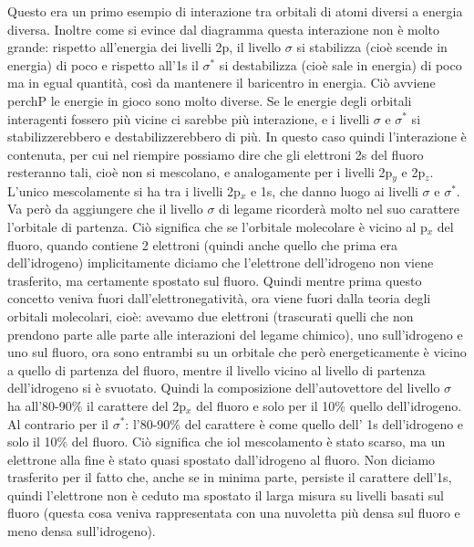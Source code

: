 Questo era un primo esempio di interazione tra orbitali di atomi diversi a energia diversa. Inoltre come si evince dal diagramma questa interazione non è molto grande: rispetto all'energia dei livelli 2p, il livello $\sigma$ si stabilizza (cioè scende in energia) di poco e rispetto all'1s il $\sigma^*$ si destabilizza (cioè sale in energia) di poco ma in egual quantità, così da mantenere il baricentro in energia. Ciò avviene perchP le energie in gioco sono molto diverse. Se le energie degli orbitali interagenti fossero più vicine ci sarebbe più interazione, e i livelli $\sigma$ e $\sigma^*$ si stabilizzerebbero e destabilizzerebbero di più. In questo caso quindi l'interazione è contenuta, per cui nel riempire possiamo dire che gli elettroni 2s del fluoro resteranno tali, cioè non si mescolano, e analogamente per i livelli 2p$_y$ e 2p$_z$. L'unico mescolamente si ha tra i livelli 2p$_x$ e 1s, che danno luogo ai livelli $\sigma$ e $\sigma^*$. Va però da aggiungere che il livello $\sigma$ di legame ricorderà molto nel suo carattere l'orbitale di partenza. Ciò significa che se l'orbitale molecolare è vicino al p$_x$ del fluoro, quando contiene 2 elettroni (quindi anche quello che prima era dell'idrogeno) implicitamente diciamo che l'elettrone dell'idrogeno non viene trasferito, ma certamente spostato sul fluoro. Quindi mentre prima questo concetto veniva fuori dall'elettronegatività, ora viene fuori dalla teoria degli orbitali molecolari, cioè: avevamo due elettroni (trascurati quelli che non prendono parte alle parte alle interazioni del legame chimico), uno sull'idrogeno e uno sul fluoro, ora sono entrambi su un orbitale che però energeticamente è vicino a quello di partenza del fluoro, mentre il livello vicino al livello di partenza dell'idrogeno si è svuotato. Quindi la composizione dell'autovettore del livello $\sigma$ ha all'80-90\% il carattere del 2p$_x$ del fluoro e solo per il 10\% quello dell'idrogeno. Al contrario per il $\sigma^*$: l'80-90\% del carattere è come quello dell' 1s dell'idrogeno e solo il 10\% del fluoro. Ciò significa che iol mescolamento è stato scarso, ma un elettrone alla fine è stato quasi spostato dall'idrogeno al fluoro. Non diciamo trasferito per il fatto che, anche se in minima parte, persiste il carattere dell'1s, quindi l'elettrone non è ceduto ma spostato il larga misura su livelli basati sul fluoro (questa cosa veniva rappresentata con una nuvoletta più densa sul fluoro e meno densa sull'idrogeno).

